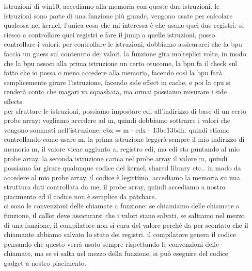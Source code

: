 \documentclass[12pt, oneside]{extbook} %
\begin{document}
istruzioni di win10, accediamo alla memoria con queste due istruzioni. le istruzioni sono parte di una funzione più grande, vengono usate per calcolare qualcosa nel kernel, l'unica cosa che mi interessa è che usano quei due registri: se riesco a controllare quei registri e fare il jump a quelle istruzioni, posso controllare i valori. per controllare le istruzioni, dobbiamo assicurarci che la bpu faccia un guess sul contenuto dei valori. la funzione gira molteplici volte, in modo che la bpu associ alla prima istruzione un certo otucome, la bpu fa il check sul fatto che io possa o meno accedere alla memoria, facendo così la bpu farà semplicemente girare l'istruzione, facendo side effect in cache, e poi la cpu si renderà conto che magari va squashata, ma ormai possiamo misurare i side effects.\\ per sfruttare le istruzioni, possiamo impostare edi all'indirizzo di base di un certo probe array: vogliamo accedere ad m, quindi dobbiamo sottrarre i valori che vengono sommati nell'istruzione: \textsf{ebx = m - edx - 13be13bdh}. quindi stiamo controllando come usare m, la prima istruzione leggerà sempre il mio indirizzo di memoria m, il valore viene aggiunto al registro edi, ma edi sta puntando al mio probe array. la seconda istruzione carica nel probe array il valore m, quindi possiamo far girare qualunque codice del kernel, shared library etc.. in modo da accedere al mio probe array. il codice è legittimo, accediamo la memoria su una struttura dati controllata da me, il probe array, quindi accediamo a nostro piacimento ed il codice non è semplice da patchare.\\ ci sono le convenzioni delle chiamate a funzione: se chiamiamo delle chiamate a funzione, il caller deve assicurarsi che i valori siano salvati, se saltiamo nel mezzo di una funzione, il compilatore non si cura del valore perché da per scontato che il chiamante abbiamo salvato lo stato dei registri. il compilatore genera il codice pensando che questo verrà usato sempre rispettando le convenzioni delle chiamate, ma se si salta nel mezzo della funzione, si può eseguire del codice gadget a nostro piacimento.
\end{document}
